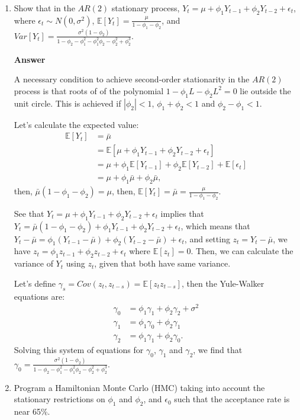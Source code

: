 \begin{enumerate}[leftmargin=*]
	\item Show that in the $AR(2)$ stationary process, $Y_t=\mu+\phi_1Y_{t-1}+\phi_2Y_{t-2}+\epsilon_t$, where $\epsilon_t\sim N(0,\sigma^2)$, $\mathbb{E}[Y_t]=\frac{\mu}{1-\phi_1-\phi_2}$, and $Var[Y_t]=\frac{\sigma^2(1-\phi_2)}{1-\phi_2-\phi_1^2-\phi_1^2\phi_2-\phi_2^2+\phi_2^3}$.

\textbf{Answer}

A necessary condition to achieve second-order stationarity in the $AR(2)$ process is that roots of of the polynomial $1-\phi_1L-\phi_2L^2=0$ lie outside the unit circle. This is achieved if $|\phi_2|<1$, $\phi_1+\phi_2<1$ and $\phi_2-\phi_1<1$.

Let's calculate the expected value:
\begin{align*}
	\mathbb{E}[Y_t]&=\bar{\mu}\\
	&=\mathbb{E}[\mu+\phi_1Y_{t-1}+\phi_2Y_{t-2}+\epsilon_t]\\
	&=\mu+\phi_1\mathbb{E}[Y_{t-1}]+\phi_2\mathbb{E}[Y_{t-2}]+\mathbb{E}[\epsilon_{t}]\\
	&=\mu+\phi_1\bar{\mu}+\phi_2\bar{\mu},
\end{align*}
then, $\bar{\mu}(1-\phi_1-\phi_2)=\mu$, then, $\mathbb{E}[Y_t]=\bar{\mu}=\frac{\mu}{1-\phi_1-\phi_2}$.

See that $Y_t=\mu+\phi_1Y_{t-1}+\phi_2Y_{t-2}+\epsilon_t$ implies that $Y_t=\bar{\mu}(1-\phi_1-\phi_2)+\phi_1Y_{t-1}+\phi_2Y_{t-2}+\epsilon_t$, which means that $Y_t-\bar{\mu}=\phi_1(Y_{t-1}-\bar{\mu})+\phi_2(Y_{t-2}-\bar{\mu})+\epsilon_t$, and setting $z_t=Y_t-\bar{\mu}$, we have $z_t=\phi_1z_{t-1}+\phi_2z_{t-2}+\epsilon_t$ where $\mathbb{E}[z_t]=0$. Then, we can calculate the variance of $Y_t$ using $z_t$, given that both have same variance.  

Let's define $\gamma_s=Cov(z_t,z_{t-s})=\mathbb{E}[z_tz_{t-s}]$, then the Yule-Walker equations are:
\begin{align*}
	\gamma_0&=\phi_1\gamma_1+\phi_2\gamma_2+\sigma^2\\
	\gamma_1&=\phi_1\gamma_0+\phi_2\gamma_1\\
	\gamma_2&=\phi_1\gamma_1+\phi_2\gamma_0.
\end{align*}  
Solving this system of equations for $\gamma_0$, $\gamma_1$ and $\gamma_2$, we find that $\gamma_0=\frac{\sigma^2(1-\phi_2)}{1-\phi_2-\phi_1^2-\phi_1^2\phi_2-\phi_2^2+\phi_2^3}$.

\item Program a Hamiltonian Monte Carlo (HMC) taking into account the stationary restrictions on $\phi_1$ and $\phi_2$, and $\epsilon_0$ such that the acceptance rate is near 65\%.


\end{enumerate}
